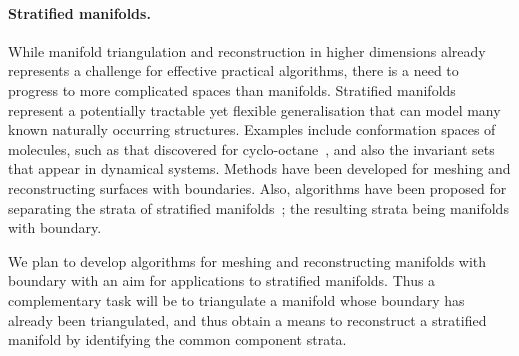 \paragraph{Stratified manifolds.}

While manifold triangulation and reconstruction in higher dimensions
already represents a challenge for effective practical algorithms,
there is a need to progress to more complicated spaces than
manifolds. Stratified manifolds represent a potentially tractable yet
flexible generalisation that can model many known naturally occurring
structures. Examples include conformation spaces of molecules, such as
that discovered for cyclo-octane~\cite{mtcw-tco-2010}, and also the invariant sets that
appear in dynamical systems.
%
Methods have been developed for meshing and reconstructing surfaces
with boundaries. Also, algorithms have been proposed for separating
the strata of stratified manifolds~\cite{bendich2007}; the resulting
strata being manifolds with boundary. 

We plan to develop algorithms for meshing and reconstructing manifolds
with boundary with an aim for applications to stratified
manifolds. Thus a complementary task will be to triangulate a manifold
whose boundary has already been triangulated, and thus obtain a means
to reconstruct a stratified manifold by identifying the common
component strata. 
